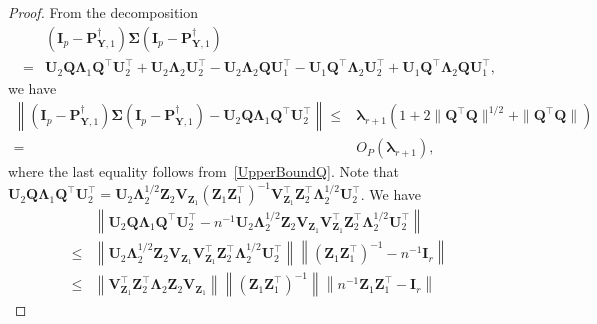 \documentclass[10pt]{book}
\theoremstyle{definition}
\newcommand{\bQ}{\mathbf{Q}}
\newcommand{\bZ}{\mathbf{Z}}
\newcommand{\bP}{\mathbf{P}}
\newcommand{\bY}{\mathbf{Y}}
\newcommand{\bI}{\mathbf{I}}
\newcommand{\bU}{\mathbf{U}}
\newcommand{\bV}{\mathbf{V}}
\newcommand{\bfsym}[1]{\ensuremath{\boldsymbol{#1}}}
\def\blambda {\bfsym {\lambda}}
\def\bLambda {\bfsym {\Lambda}}
\def\bSigma {\bfsym {\Sigma}}
\begin{document}
\begin{proof}
         From the decomposition
         \begin{equation*}
             \begin{split}
         &(\bI_p-\bP_{\bY,1}^{\dagger})
         \bSigma 
         (\bI_p-\bP_{\bY,1}^{\dagger})
         \\
             =&
             \bU_2\bQ \bLambda_1 \bQ^\top \bU_2^\top 
             +\bU_2\bLambda_2  \bU_2^\top
             -\bU_2 \bLambda_2 \bQ \bU_1^\top
             -\bU_1 \bQ^\top \bLambda_2 \bU_2^\top
             +\bU_1 \bQ^\top \bLambda_2 \bQ \bU_1^\top,
             \end{split}
         \end{equation*}
         we have
         \begin{equation}\label{choc2}
             \begin{split}
         \left\|
         (\bI_p-\bP_{\bY,1}^{\dagger})
         \bSigma 
         (\bI_p-\bP_{\bY,1}^{\dagger})
             -
             \bU_2 \bQ \bLambda_1 \bQ^\top  \bU_2^\top
             \right\|
             \leq &
             \blambda_{r+1}(1+2\|\bQ^\top \bQ\|^{1/2}+\|\bQ^\top \bQ\|)
             \\
             = &
             O_P\left(\blambda_{r+1}\right)
             ,
             \end{split}
         \end{equation}
         where the last equality follows from~\eqref{UpperBoundQ}.
         Note that
         $
             \bU_2\bQ \bLambda_1 \bQ^\top\bU_2^\top
             =
             \bU_2 \bLambda_2^{1/2} \bZ_2 \bV_{\bZ_1} (\bZ_1 \bZ_1^\top)^{-1}\bV_{\bZ_1}^\top \bZ_2^\top \bLambda_2^{1/2} \bU_2^\top$. 
             We have
     \begin{equation} \label{choc6}
     \begin{split}
             &\left\|\bU_2\bQ \bLambda_1 \bQ^\top\bU_2^\top
             -
             n^{-1} \bU_2 \bLambda_2^{1/2} \bZ_2 \bV_{\bZ_1} \bV_{\bZ_1}^\top \bZ_2^\top \bLambda_2^{1/2} \bU_2^\top
             \right\|
             \\
             \leq&
             \left\|\bU_2 \bLambda_2^{1/2} \bZ_2 \bV_{\bZ_1}\bV_{\bZ_1}^\top \bZ_2^\top \bLambda_2^{1/2} \bU_2^\top\right\|
             \left\|(\bZ_1 \bZ_1^\top)^{-1} - n^{-1} \bI_r\right\|
                  \\
            \leq&
             \left\|\bV_{\bZ_1}^\top \bZ_2^\top \bLambda_2 \bZ_2 \bV_{\bZ_1}\right\|
                  \left\|(\bZ_1 \bZ_1^\top)^{-1}\right\|
                  \left\|n^{-1}\bZ_1 \bZ_1^\top -\bI_r\right\|

\end{split}
\end{equation}
\end{proof}
\end{document}
